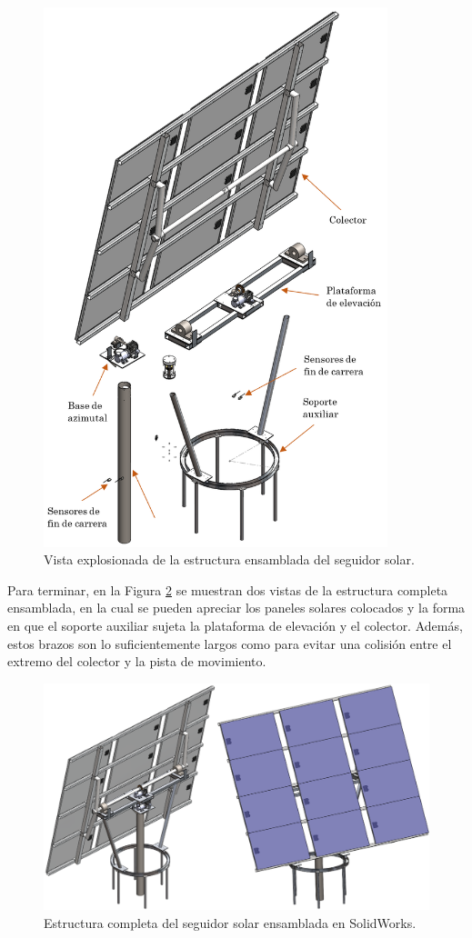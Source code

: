 \begin{figure}[H]
	\centering
	\includegraphics[width=10cm]{imagenes/gir1}
	\caption{Vista explosionada de la estructura ensamblada del seguidor solar.}
	\label{fig:gir1}
\end{figure}

\newpage
Para terminar, en la Figura \ref{fig:gir4} se muestran dos vistas de la estructura completa ensamblada, en la cual se pueden apreciar los paneles solares colocados y la forma en que el soporte auxiliar sujeta la plataforma de elevación y el colector. Además, estos brazos son lo suficientemente largos como para evitar una colisión entre el extremo del colector y la pista de movimiento.

\begin{figure}[H]
	\centering
	\includegraphics[width=\columnwidth]{imagenes/gir4}
	\caption{Estructura completa del seguidor solar ensamblada en SolidWorks.}
	\label{fig:gir4}
\end{figure}

